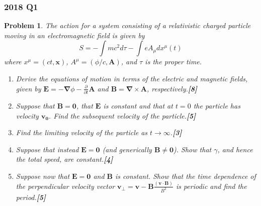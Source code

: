 \documentclass[a4paper]{article}
\theoremstyle{new}
\newtheorem{qns}{Problem}[section]
\begin{document}
\subsubsection*{2018 Q1}
\begin{qns}
The action for a system consisting of a relativistic charged particle moving in an electromagnetic field is given by
$$S=-\int mc^2 d\tau-\int eA_\mu dx^\mu (t)$$
where $x^\mu=(ct,\mathbf{x})$, $A^\mu=(\phi/c,\mathbf{A})$, and $\tau$ is the proper time.
\begin{enumerate}[label=(\alph*)]
\item Derive the equations of motion in terms of the electric and magnetic fields, given by $\mathbf{E} = −\boldsymbol{\nabla}\phi −\frac{\partial}{\partial t}\mathbf{A}$ and $\boldsymbol{B} = \boldsymbol{\nabla}\times\mathbf{A}$, respectively.\hfill\textbf{[8]}
\item Suppose that $\mathbf{B} = \boldsymbol{0}$, that $\mathbf{E}$ is constant and that at $t = 0$ the particle has velocity $\mathbf{v_0}$. Find the subsequent velocity of the particle.\hfill\textbf{[5]}
\item  Find the limiting velocity of the particle as $t\rightarrow\infty$.\hfill\textbf{[3]}
\item Suppose that instead $\mathbf{E} = \boldsymbol{0}$ (and generically $\mathbf{B}\neq\boldsymbol{0}$). Show that $\gamma$, and hence the total speed, are constant.\hfill\textbf{[4]}
\item Suppose now that $\mathbf{E} = \boldsymbol{0}$ and $\mathbf{B}$ is constant. Show that the time dependence of the perpendicular velocity vector $\mathbf{v_\perp}=\mathbf{v}-\mathbf{B}\frac{(\mathbf{v}\cdot\mathbf{B})}{B^2}$ is periodic and find the period.\hfill\textbf{[5]}
\end{enumerate}
\end{qns}
\end{document}
